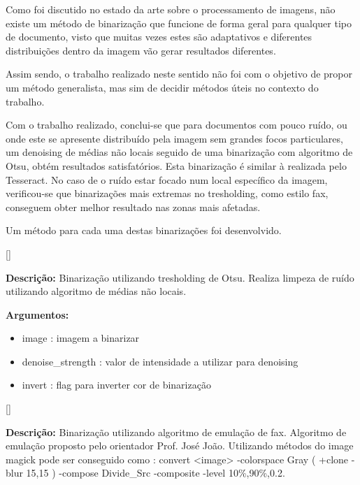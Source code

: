 \label{contribution_image_binarization}

Como foi discutido no estado da arte sobre o processamento de imagens, não existe um método de binarização que funcione de forma geral para qualquer tipo de documento, visto que muitas vezes estes são adaptativos e diferentes distribuições dentro da imagem vão gerar resultados diferentes.

Assim sendo, o trabalho realizado neste sentido não foi com o objetivo de propor um método generalista, mas sim de decidir métodos úteis no contexto do trabalho.

Com o trabalho realizado, conclui-se que para documentos com pouco ruído, ou onde este se apresente distribuído pela imagem sem grandes focos particulares, um denoising de médias não locais seguido de uma binarização com algoritmo de Otsu, obtém resultados satisfatórios. Esta binarização é similar à realizada pelo Tesseract.
No caso de o ruído estar focado num local específico da imagem, verificou-se que binarizações mais extremas no tresholding, como estilo fax, conseguem obter melhor resultado nas zonas mais afetadas.


Um método para cada uma destas binarizações foi desenvolvido.

[\normalsize]

\textbf{Descrição:} Binarização utilizando tresholding de Otsu. Realiza limpeza de ruído utilizando algoritmo de médias não locais.

\textbf{Argumentos:}
\begin{itemize}\setlength\itemsep{-0.3em}
	\item image : imagem a binarizar
	\item denoise\_strength : valor de intensidade a utilizar para denoising
	\item invert : flag para inverter cor de binarização
\end{itemize}

[\normalsize]

\textbf{Descrição:} Binarização utilizando algoritmo de emulação de fax. Algoritmo de emulação proposto pelo orientador Prof. José João. Utilizando métodos do image magick pode ser conseguido como : convert <image> -colorspace Gray ( +clone -blur 15,15 ) -compose Divide\_Src -composite -level 10\%,90\%,0.2.


